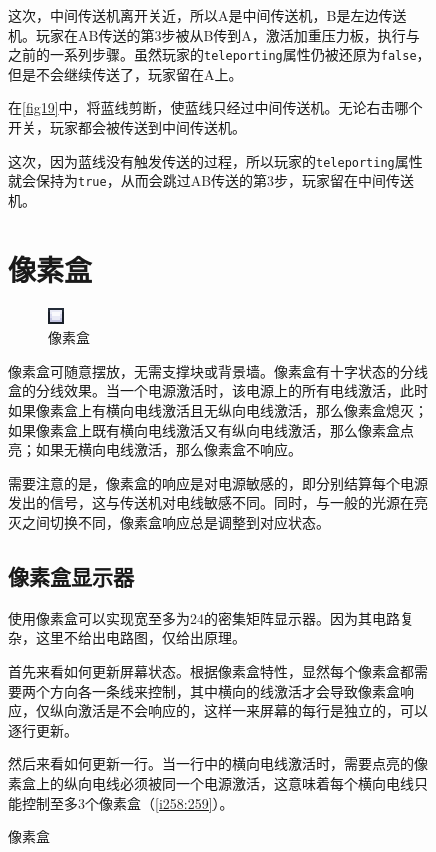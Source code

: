 \begin{figure}[!ht]
\begin{example}
这次，中间传送机离开关近，所以A是中间传送机，B是左边传送机。玩家在AB传送的第3步被从B传到A，激活加重压力板，执行与之前的一系列步骤。虽然玩家的\lstinline{teleporting}属性仍被还原为\lstinline{false}，但是不会继续传送了，玩家留在A上。
\end{example}

\begin{example}
在\autoref{fig19}中，将蓝线剪断，使蓝线只经过中间传送机。无论右击哪个开关，玩家都会被传送到中间传送机。

这次，因为蓝线没有触发传送的过程，所以玩家的\lstinline{teleporting}属性就会保持为\lstinline{true}，从而会跳过AB传送的第3步，玩家留在中间传送机。
\end{example}

\section{像素盒}
\begin{figure}[!ht]
\centering
\includegraphics{figures/Pixel_Box.png}
\caption{像素盒}
\end{figure}
像素盒可随意摆放，无需支撑块或背景墙。像素盒有十字状态的分线盒的分线效果。当一个电源激活时，该电源上的所有电线激活，此时如果像素盒上有横向电线激活且无纵向电线激活，那么像素盒熄灭；如果像素盒上既有横向电线激活又有纵向电线激活，那么像素盒点亮；如果无横向电线激活，那么像素盒不响应。

需要注意的是，像素盒的响应是对电源敏感的，即分别结算每个电源发出的信号，这与传送机对电线敏感不同。同时，与一般的光源在亮灭之间切换不同，像素盒响应总是调整到对应状态。

\subsection{像素盒显示器}\label{sec21}

使用像素盒可以实现宽至多为24的密集矩阵显示器。因为其电路复杂，这里不给出电路图，仅给出原理。

首先来看如何更新屏幕状态。根据像素盒特性，显然每个像素盒都需要两个方向各一条线来控制，其中横向的线激活才会导致像素盒响应，仅纵向激活是不会响应的，这样一来屏幕的每行是独立的，可以逐行更新。

然后来看如何更新一行。当一行中的横向电线激活时，需要点亮的像素盒上的纵向电线必须被同一个电源激活，这意味着每个横向电线只能控制至多3个像素盒（\autoref{i258:259}）。


\end{figure}
